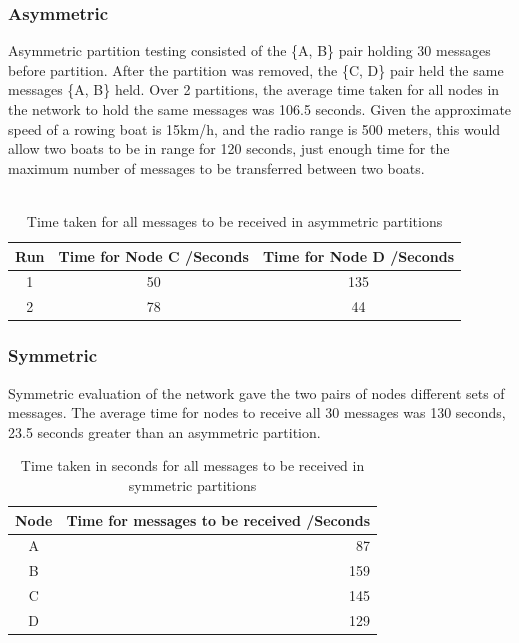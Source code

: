 \documentclass[12pt,a4paper]{report}
\begin{document}
\subsubsection{Asymmetric}
Asymmetric partition testing consisted of the \{A, B\} pair holding 30 messages before partition. After the partition was removed, the \{C, D\} pair held the same messages \{A, B\} held. Over 2 partitions, the average time taken for all nodes in the network to hold the same messages was 106.5 seconds. Given the approximate speed of a rowing boat is 15km/h, and the radio range is 500 meters, this would allow two boats to be in range for 120 seconds, just enough time for the maximum number of messages to be transferred between two boats.  \\ \\
\begin{table}[h]
\begin{center}
\begin{tabular}{ |c|c|c| } 
\hline
Run & Time for Node C /Seconds & Time for Node D /Seconds \\ 
\hline
1 & 50 & 135 \\ 
\hline
2 & 78 & 44  \\ 
\hline
\end{tabular}
\end{center}
\caption{Time taken for all messages to be received in asymmetric partitions}
\end{table}  
\FloatBarrier 

\subsubsection{Symmetric}
Symmetric evaluation of the network gave the two pairs of nodes different sets of messages.
The average time for nodes to receive all 30 messages was 130 seconds, 23.5 seconds greater than an asymmetric partition.
\begin{table}[h]
\begin{center}
\begin{tabular}{ |c|r| } 
\hline
Node & Time for messages to be received /Seconds\\ 
\hline
A & 87 \\
\hline
B & 159 \\
\hline
C & 145 \\
\hline
D & 129 \\ 
\hline
\end{tabular}
\end{center}
\caption{Time taken in seconds for all messages to be received in symmetric partitions}
\end{table}  
\FloatBarrier
\end{document}

